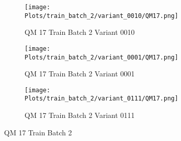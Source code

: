 \documentclass{DissertateFigs}
\begin{document}
\begin{figure}[t!]
\medskip

    \begin{subfigure}{0.43\textwidth}
    \texttt{[image: Plots/train\_batch\_2/variant\_0010/QM17.png]}
    \caption{QM 17 Train Batch 2 Variant 0010}
    \end{subfigure}
    \begin{subfigure}{0.43\textwidth}
    \texttt{[image: Plots/train\_batch\_2/variant\_0001/QM17.png]}
    \caption{QM 17 Train Batch 2 Variant 0001}
    \end{subfigure}

\medskip

    \begin{subfigure}{0.43\textwidth}
    \texttt{[image: Plots/train\_batch\_2/variant\_0111/QM17.png]}
    \caption{QM 17 Train Batch 2 Variant 0111}
    \end{subfigure}
\caption{QM 17 Train Batch 2}
    \end{figure}
\clearpage
\end{document}
